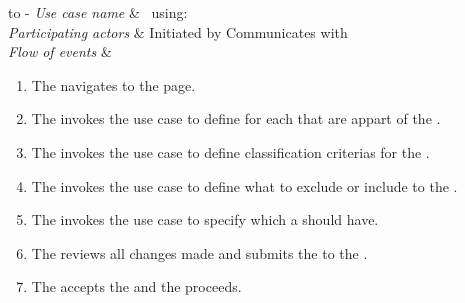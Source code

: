 %
%
\begin{table}[H]
\tabulinesep =1.5mm
\begin{tabu} to 
	\tabucline[1.5pt]-
	\textit{Use case name} & \manageStudy \, using:\, \manageClassCrit \\
	\hline
	\textit{Participating actors} & Initiated by \client \newline Communicates with \serverside \\
	\hline
	\textit{Flow of events} &
	\vspace{-3mm}

\begin{enumerate}[leftmargin=*,topsep=0pt,itemsep=-1ex]
	\item The \client navigates to the \serverside page.\\
	\item The \client invokes the \manageRole use case to define \role for each \user that are appart of the \studycon.\\
	\item The \client invokes the \manageClassCrit use case to define classification criterias for the \studycon.\\
	\item The \client invokes the \manageInExCrit use case to define  what to exclude or include to the \studycon.\\
	\item The \client  invokes the \manageTask use case to specify which \task a \user should have.\\
	\item The \client reviews all changes made and submits the \studycon to the \serverside.	
			
				\setlength{\itemindent}{2cm}
				\item \parbox[t]{\linewidth-\itemindent}{The \serverside accepts the \user and the \request proceeds.}
		

\end{enumerate}
\end{tabu}
\end{table}

